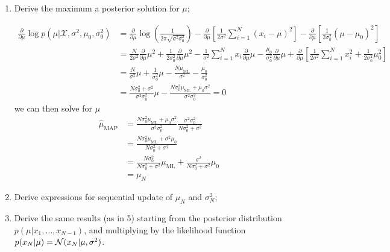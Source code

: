 \documentclass{amsmlaj}
\begin{document}
\begin{problem}
\begin{enumerate}
\item Derive the maximum a posterior solution for $\mu$;

	\begin{equation}
		\begin{split}
						\frac{\partial}{\partial\mu}\log p(\mu|\mathcal{X},\sigma^2,\mu_0,\sigma_0^2)
						&=\frac{\partial}{\partial\mu}\log\left(\frac{1}{2\pi\sqrt{\sigma^2\sigma_0^2}}\right)
						-\frac{\partial}{\partial\mu}\left[\frac{1}{2\sigma^2}\sum_{i=1}^N(x_i-\mu)^2
						\right]-\frac{\partial}{\partial\mu}\left[
										\frac{1}{2\sigma_0^2}(\mu-\mu_0)^2
						\right] \\
						&=\frac{N}{2\sigma^2}\frac{\partial}{\partial\mu}\mu^2+
						\frac{1}{2\sigma_0^2}\frac{\partial}{\partial\mu}\mu^2-
						\frac{1}{\sigma^2}\sum_{i=1}^N x_i\frac{\partial}{\partial\mu}\mu-
						\frac{\mu_0}{\sigma_0^2}\frac{\partial}{\partial\mu}\mu+
						\frac{\partial}{\partial\mu}\left[ 
										\frac{1}{2\sigma^2}\sum_{i=1}^N x_i^2 +
										\frac{1}{2\sigma_0^2}\mu_0^2
						\right] \\
						&=\frac{N}{\sigma^2}\mu +
						\frac{1}{\sigma_0^2}\mu -
						\frac{N\mu_\text{ML}}{\sigma^2} -
						\frac{\mu_0}{\sigma_0^2} \\
						&=
						\frac{N\sigma_0^2+\sigma^2}{\sigma^2\sigma_0^2}\mu -
						\frac{N\sigma_0^2\mu_\text{ML}+\mu_0\sigma^2}{\sigma^2\sigma_0^2}=0
		\end{split}
	\end{equation}
	we can then solve for $\mu$
	\begin{equation}
		\begin{split}
					\hat{\mu}_\text{MAP}&=
						\frac{N\sigma_0^2\mu_\text{ML}+\mu_0\sigma^2}{\sigma^2\sigma_0^2}
						\frac{\sigma^2\sigma_0^2}{N\sigma_0^2+\sigma^2} \\
						&=\frac{N\sigma_0^2\mu_\text{ML}+\sigma^2\mu_0}{N\sigma_0^2+\sigma^2} \\
						&=\frac{N\sigma_0^2}{N\sigma_0^2+\sigma^2}\mu_\text{ML}
						+\frac{\sigma^2}{N\sigma_0^2+\sigma^2}\mu_0 \\
						&=\mu_N
		\end{split}
	\end{equation}

\item Derive expressions for sequential update of $\mu_N$ and
				$\sigma_N^2$;
\item Derive the same results (as in 5) starting from the
				posterior distribution $p(\mu|x_1,\dots,x_{N-1})$, and
				multiplying by the likelihood function $p(x_N |\mu) =
				\mathcal{N}(x_N |\mu,\sigma^2)$.
\end{enumerate}
\end{problem}
\end{document}

